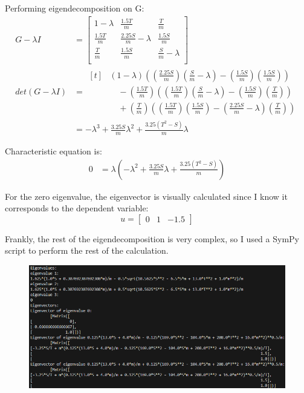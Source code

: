 \documentclass[twoside,12pt]{article}
\begin{document}
\begin{enumerate}
    Performing eigendecomposition on G:
    \begin{align*}
    G -\lambda I &=\begin{bmatrix}
        1 - \lambda & \frac {1.5T} m & \frac T m\\
        \frac {1.5T} m & \frac {2.25S}{m} - \lambda  & \frac {1.5S} m\\
        \frac T m & \frac {1.5S} m & \frac{S}{m}- \lambda \\
     \end{bmatrix}\\
    det(G -\lambda I) & = \begin{aligned}[t]
        & (1 - \lambda)((\frac {2.25S}{m})(\frac{S}{m}- \lambda)-(\frac {1.5S} m)(\frac {1.5S} m)) \\
        &\quad - (\frac {1.5T} m)((\frac {1.5T} m)(\frac{S}{m}- \lambda)-(\frac {1.5S} m)(\frac T m)) \\ 
        &\quad + (\frac T m)((\frac {1.5T} m)(\frac {1.5S} m)-(\frac {2.25S}{m} - \lambda)(\frac T m))
        \end{aligned}\\
        &= -\lambda^3 + \frac{3.25S}{m}\lambda^2 + \frac{3.25(T^2-S)}{m}\lambda
    \end{align*}

    Characteristic equation is:
    \begin{align*}
    0 &= \lambda(-\lambda^2 + \frac{3.25S}{m}\lambda + \frac{3.25(T^2-S)}{m})
    \end{align*}

    For the zero eigenvalue, the eigenvector is visually calculated since I know it corresponds to the dependent variable: 
    $$u = \begin{bmatrix}
        0 & 1 & -1.5
    \end{bmatrix}$$

    Frankly, the rest of the eigendecomposition is very complex, so I used a SymPy script to perform the rest of the calculation.

    \begin{figure}[H]
        \centering
        \includegraphics[width=\textwidth, height=.5\textwidth]{images/eigendecomp.png}
    \end{figure}


\end{enumerate}
\end{document}
